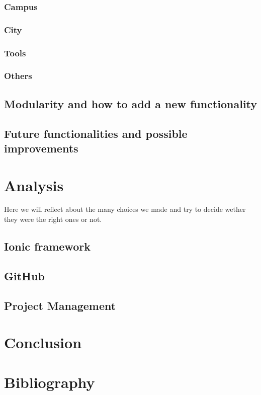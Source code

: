 \documentclass[11pt, a4paper]{report}
\begin{document}
\subsection{Campus}

\subsection{City}

\subsection{Tools}

\subsection{Others}


\section{Modularity and how to add a new functionality}

\section{Future functionalities and possible improvements}

\chapter{Analysis}

Here we will reflect about the many choices we made and try to decide wether they were the right ones or not.

\section{Ionic framework}

\section{GitHub}

\section{Project Management}


\chapter{Conclusion} 

\chapter{Bibliography}
\end{document}
